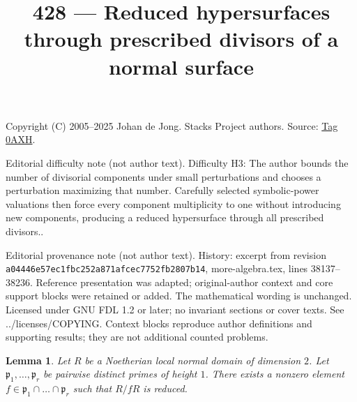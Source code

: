 \documentclass{amsart}
\theoremstyle{plain}
\newtheorem{lemma}[subsection]{Lemma}
\theoremstyle{definition}
\theoremstyle{remark}
\numberwithin{equation}{subsection}
\begin{document}
\title[Stacks Project, Tag 0AXH]{428 --- Reduced hypersurfaces through prescribed divisors of a normal surface}
\maketitle
\noindent Copyright (C) 2005--2025 Johan de Jong. Stacks Project authors. Source: \href{https://stacks.math.columbia.edu/tag/0AXH}{Tag 0AXH}.

\noindent Editorial difficulty note (not author text). Difficulty H3: The author bounds the number of divisorial components under small perturbations and chooses a perturbation maximizing that number. Carefully selected symbolic-power valuations then force every component multiplicity to one without introducing new components, producing a reduced hypersurface through all prescribed divisors..

\noindent Editorial provenance note (not author text). History: excerpt from revision \texttt{a0444\allowbreak 6e57e\allowbreak c1fbc\allowbreak 252a8\allowbreak 71afc\allowbreak ec775\allowbreak 2fb28\allowbreak 07b14}, more-algebra.tex, lines 38137--38236. Reference presentation was adapted; original-author context and core support blocks were retained or added. The mathematical wording is unchanged. Licensed under GNU FDL 1.2 or later; no invariant sections or cover texts. See ../licenses/COPYING. Context blocks reproduce author definitions and supporting results; they are not additional counted problems.

\begin{lemma}
\label{lemma-radical-element}
Let $R$ be a Noetherian local normal domain of dimension $2$.
Let $\mathfrak p_1, \ldots, \mathfrak p_r$ be pairwise distinct
primes of height $1$. There exists a nonzero element
$f \in \mathfrak p_1 \cap \ldots \cap \mathfrak p_r$ such
that $R/fR$ is reduced.
\end{lemma}
\end{document}
